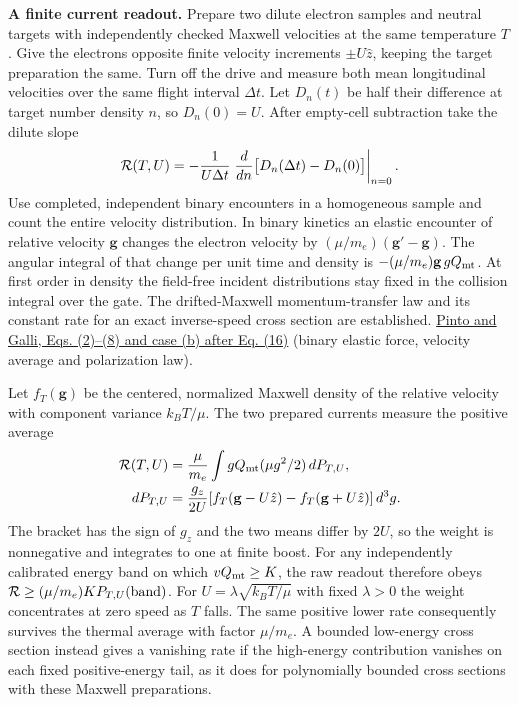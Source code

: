 \documentclass[11pt,a4paper]{article}
\begin{document}
\textbf{A finite current readout.} Prepare two dilute electron samples
and neutral targets with independently checked Maxwell velocities at the
same temperature \(T\). Give the electrons opposite finite velocity
increments \(\pm U\hat z\), keeping the target preparation the same.
Turn off the drive and measure both mean longitudinal velocities over
the same flight interval \(\Delta t\). Let \(D_n(t)\) be half their
difference at target number density \(n\), so \(D_n(0)=U\). After
empty-cell subtraction take the dilute slope \[
 {\cal R}(T,U)=-\frac{1}{U\Delta t}
 \left.\frac{d}{dn}\big[D_n(\Delta t)-D_n(0)\big]\right|_{n=0}.
\] Use completed, independent binary encounters in a homogeneous sample
and count the entire velocity distribution. In binary kinetics an
elastic encounter of relative velocity \(\mathbf g\) changes the
electron velocity by \((\mu/m_e)(\mathbf g'-\mathbf g)\). The angular
integral of that change per unit time and density is
\(-(\mu/m_e)\mathbf g\,gQ_{\rm mt}\). At first order in density the
field-free incident distributions stay fixed in the collision integral
over the gate. The drifted-Maxwell momentum-transfer law and its
constant rate for an exact inverse-speed cross section are established.
\href{https://arxiv.org/pdf/0804.2856}{Pinto and Galli, Eqs. (2)--(8)
and case (b) after Eq. (16)} (binary elastic force, velocity average and
polarization law).

Let \(f_T(\mathbf g)\) be the centered, normalized Maxwell density of
the relative velocity with component variance \(k_BT/\mu\). The two
prepared currents measure the positive average \[
 \begin{aligned}
 {\cal R}(T,U)&=\frac{\mu}{m_e}\int gQ_{\rm mt}(\mu g^2/2)\,dP_{T,U},\\
 dP_{T,U}&=\frac{g_z}{2U}
 [f_T(\mathbf g-U\hat z)-f_T(\mathbf g+U\hat z)]\,d^3g .
 \end{aligned}
\] The bracket has the sign of \(g_z\) and the two means differ by
\(2U\), so the weight is nonnegative and integrates to one at finite
boost. For any independently calibrated energy band on which
\(vQ_{\rm mt}\ge K\), the raw readout therefore obeys
\(\mathcal R\ge(\mu/m_e)K P_{T,U}({\rm band})\). For
\(U=\lambda\sqrt{k_BT/\mu}\) with fixed \(\lambda>0\) the weight
concentrates at zero speed as \(T\) falls. The same positive lower rate
consequently survives the thermal average with factor \(\mu/m_e\). A
bounded low-energy cross section instead gives a vanishing rate if the
high-energy contribution vanishes on each fixed positive-energy tail, as
it does for polynomially bounded cross sections with these Maxwell
preparations.
\end{document}
